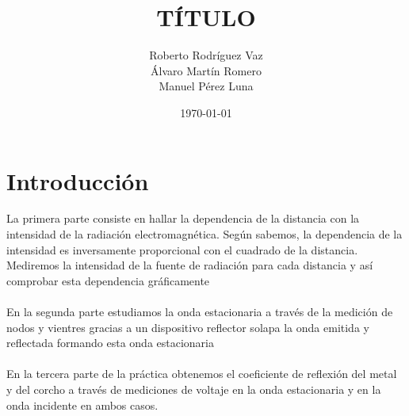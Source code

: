 \documentclass[a4paper,10pt,twocolumns]{article}
\title{TÍTULO}
\date{\today}
\author{Roberto Rodríguez Vaz\\
Álvaro Martín Romero \\
Manuel Pérez Luna}
\begin{document}
\newpage
{}
\section{Introducción}
La primera parte consiste en hallar la dependencia de la distancia con la intensidad de la radiación electromagnética. Según sabemos, la dependencia de la intensidad es inversamente proporcional con el cuadrado de la distancia. Mediremos la intensidad de la fuente de radiación para cada distancia y así comprobar esta dependencia gráficamente
\\
\\
En la segunda parte estudiamos la onda estacionaria a través de la medición de nodos y vientres gracias a un dispositivo reflector solapa la onda emitida y reflectada formando esta onda estacionaria 
\\
\\
En la tercera parte de la práctica obtenemos el coeficiente de reflexión del metal y del corcho a través de mediciones de voltaje en la onda estacionaria y en la onda incidente en ambos casos. 
\end{document}
